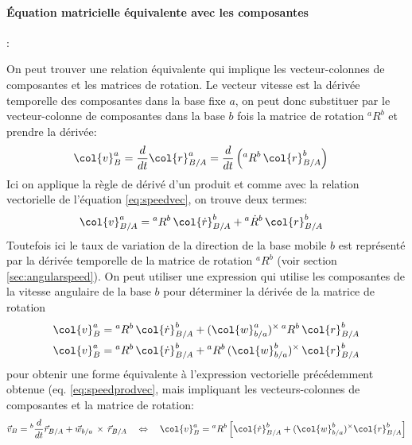 \paragraph{Équation matricielle équivalente avec les composantes}:

On peut trouver une relation équivalente qui implique les vecteur-colonnes de composantes et les matrices de rotation. Le vecteur vitesse est la dérivée temporelle des composantes dans la base fixe $a$, on peut donc substituer par le vecteur-colonne de composantes dans la base $b$ fois la matrice de rotation ${}^{a}R^b$ et prendre la dérivée:
\begin{align}
\col{v}_{B}^a &= \frac{d}{dt} \col{r}_{B/A}^a = 
\frac{d}{dt} \left( {}^{a}R^b \, \col{r}_{B/A}^b \right) 
\end{align}
Ici on applique la règle de dérivé d'un produit et comme avec la relation vectorielle de l'équation \eqref{eq:speedvec}, on trouve deux termes:
\begin{align}
\col{v}_{B/A}^a &=
{}^{a}R^b \, \col{\dot{r}}_{B/A}^b + {}^{a}\dot{R}^b \, \col{r}_{B/A}^b 
\end{align}
Toutefois ici le taux de variation de la direction de la base mobile $b$ est représenté par la dérivée temporelle de la matrice de rotation ${}^{a}R^b$ (voir section \ref{sec:angularspeed}). On peut utiliser une expression qui utilise les composantes de la vitesse angulaire de la base $b$ pour déterminer la dérivée de la matrice de rotation
\begin{align}
\col{v}_{B}^a &=
{}^{a}R^b \, \col{\dot{r}}_{B/A}^b + (\col{w}_{b/a}^a)^{\times} \, {}^{a}R^b \, \col{r}_{B/A}^b \\
\col{v}_{B}^a &=
{}^{a}R^b \, \col{\dot{r}}_{B/A}^b +  {}^{a}R^b \, (\col{w}_{b/a}^b)^{\times} \, \col{r}_{B/A}^b
\end{align}
pour obtenir une forme équivalente à l'expression vectorielle précédemment obtenue (eq. \eqref{eq:speedprodvec}, mais impliquant les vecteurs-colonnes de composantes et la matrice de rotation:
\begin{align}
\vec{v}_{B} = {}^{b}\frac{d}{dt} \vec{r}_{B/A} +  \vec{w}_{b/a} \, \times \, \vec{r}_{B/A}
\quad \Leftrightarrow \quad 
\col{v}_{B}^{a} = {}^{a}R^b \left[ \col{\dot{r}}^b_{B/A} +  (\col{w}_{b/a}^b)^{\times} \col{r}^b_{B/A}  \right] 
\end{align}



